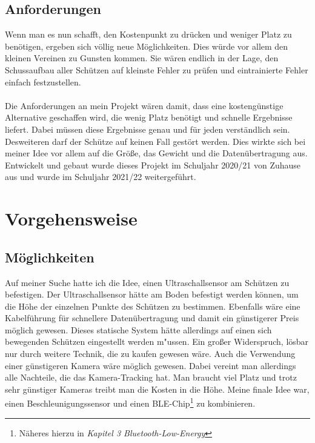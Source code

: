 \subsection{Anforderungen}
Wenn man es nun schafft, den Kostenpunkt zu drücken und weniger Platz zu benötigen,
ergeben sich völlig neue Möglichkeiten. Dies würde vor allem den kleinen Vereinen zu Gunsten 
kommen. Sie wären endlich in der Lage, den Schussaufbau aller Schützen auf kleinste Fehler 
zu prüfen und eintrainierte Fehler einfach festzustellen.\\
\\
Die Anforderungen an mein Projekt wären damit, dass eine kostengünstige Alternative 
geschaffen wird, die wenig Platz benötigt und schnelle Ergebnisse liefert. Dabei müssen diese 
Ergebnisse genau und für jeden verständlich sein.\\
Desweiteren darf der Schütze auf keinen Fall gestört werden.
Dies wirkte sich bei meiner Idee vor allem auf die Größe, das Gewicht und die 
Datenübertragung aus.\\
Entwickelt und gebaut wurde dieses Projekt im Schuljahr 2020/21 von Zuhause aus und wurde 
im Schuljahr 2021/22 weitergeführt.

\section{Vorgehensweise}
\subsection{Möglichkeiten}
Auf meiner Suche hatte ich die Idee, einen Ultraschallsensor am Schützen zu befestigen. Der 
Ultraschallsensor hätte am Boden befestigt werden können, um die Höhe der einzelnen 
Punkte des Schützen zu bestimmen. Ebenfalls wäre eine Kabelführung für schnellere 
Datenübertragung und damit ein günstigerer Preis möglich gewesen. Dieses statische System
hätte allerdings auf einen sich bewegenden Schützen eingestellt werden m"ussen. Ein großer Widerspruch,
lösbar nur durch weitere Technik, die zu kaufen gewesen wäre.
Auch die Verwendung einer günstigeren Kamera wäre möglich gewesen. Dabei vereint man 
allerdings alle Nachteile, die das Kamera-Tracking hat. Man braucht viel Platz und trotz sehr 
günstiger Kameras treibt man die Kosten in die Höhe.
Meine finale Idee war, einen Beschleunigungssensor und einen BLE-Chip\footnote{Näheres hierzu in \textit{Kapitel 3 Bluetooth-Low-Energy}} zu kombinieren.

%


